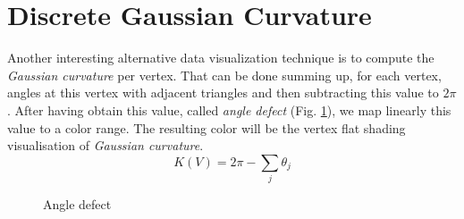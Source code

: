 \section{Discrete Gaussian Curvature}
\label{section:vertex-area-gaussian-curvature}
Another interesting alternative data visualization technique is to compute the \textit{Gaussian curvature} per vertex. That can be done summing up, for each vertex, angles at this vertex with adjacent triangles and then subtracting this value to $2\pi$.
After having obtain this value, called \textit{angle defect} (Fig. \ref{fig:gc-angle}), we map linearly this value to a color range.
The resulting color will be the vertex flat shading visualisation of \textit{Gaussian curvature}.
$$K(V) = 2\pi - \sum_j \theta_j$$
\begin{figure}[!h]
    \centering
    \caption{Angle defect}\label{fig:gc-angle}
\end{figure}
